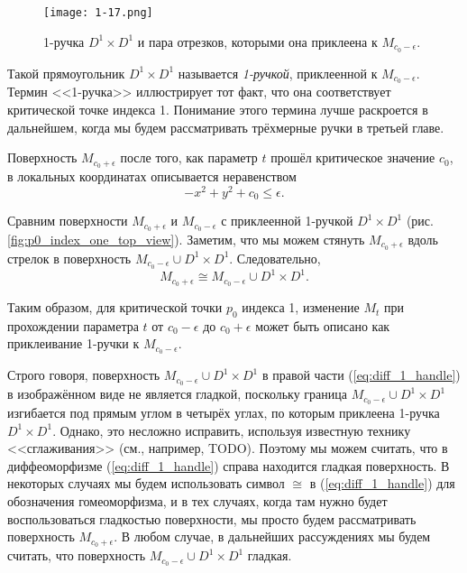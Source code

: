 \documentclass[a4paper,12pt,openany,leqno]{extbook}
\begin{document}
\begin{figure}[ht]
\texttt{[image: 1-17.png]}
\caption{1-ручка $D^1 \times D^1$ и пара отрезков, которыми она приклеена к $M_{c_0 - \epsilon}$.}
\label{fig:handle_2d}
\end{figure}

Такой прямоугольник $D^1 \times D^1$ называется \emph{1-ручкой}, приклеенной к $M_{c_0 - \epsilon}$. Термин <<1-ручка>> иллюстрирует тот факт, что она соответствует критической точке индекса 1. Понимание этого термина лучше раскроется в дальнейшем, когда мы будем рассматривать трёхмерные ручки в третьей главе.

Поверхность $M_{c_0 + \epsilon}$ после того, как параметр $t$ прошёл критическое значение $c_0$, в локальных координатах описывается неравенством
\[
-x^2 + y^2 + c_0 \leq \epsilon.
\]

Сравним поверхности $M_{c_0 + \epsilon}$ и $M_{c_0 - \epsilon}$ с приклеенной 1-ручкой $D^1 \times D^1$ (рис. \ref{fig:p0_index_one_top_view}). Заметим, что мы можем стянуть $M_{c_0 + \epsilon}$ вдоль стрелок в поверхность $M_{c_0 - \epsilon} \cup D^1 \times D^1$. Следовательно,
\begin{equation}
M_{c_0 + \epsilon} \cong M_{c_0 - \epsilon} \cup D^1 \times D^1.
\label{eq:diff_1_handle}
\end{equation}

Таким образом, для критической точки $p_0$ индекса 1, изменение $M_t$ при прохождении параметра $t$ от $c_0 - \epsilon$ до $c_0 + \epsilon$ может быть описано как приклеивание 1-ручки к $M_{c_0 - \epsilon}$.

Строго говоря, поверхность $M_{c_0 - \epsilon} \cup D^1 \times D^1$ в правой части (\ref{eq:diff_1_handle}) в изображённом виде не является гладкой, поскольку граница $M_{c_0 - \epsilon} \cup D^1 \times D^1$ изгибается под прямым углом в четырёх углах, по которым приклеена 1-ручка $D^1 \times D^1$. Однако, это несложно исправить, используя известную технику <<сглаживания>> (см., например, TODO). Поэтому мы можем считать, что в диффеоморфизме (\ref{eq:diff_1_handle}) справа находится гладкая поверхность. В некоторых случаях мы будем использовать символ $\cong$ в (\ref{eq:diff_1_handle}) для обозначения гомеоморфизма, и в тех случаях, когда там нужно будет воспользоваться гладкостью поверхности, мы просто будем рассматривать поверхность $M_{c_0 + \epsilon}$. В любом случае, в дальнейших рассуждениях мы будем считать, что поверхность $M_{c_0 - \epsilon} \cup D^1 \times D^1$ гладкая.
\end{document}
